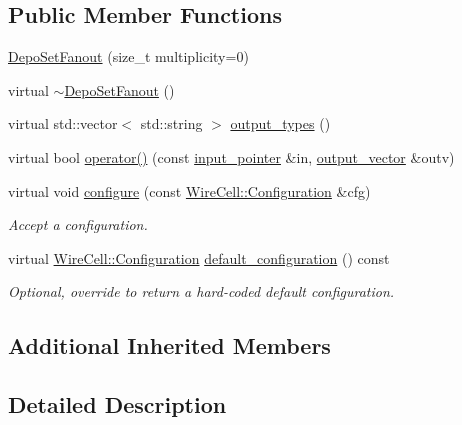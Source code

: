 \subsection*{Public Member Functions}
\begin{DoxyCompactItemize}
\item 
\hyperlink{class_wire_cell_1_1_gen_1_1_depo_set_fanout_a655d25f1ea022ac0edc28852dc01befc}{Depo\+Set\+Fanout} (size\+\_\+t multiplicity=0)
\item 
virtual \hyperlink{class_wire_cell_1_1_gen_1_1_depo_set_fanout_ace5b227dc8d232fbb32e35f7c41788e7}{$\sim$\+Depo\+Set\+Fanout} ()
\item 
virtual std\+::vector$<$ std\+::string $>$ \hyperlink{class_wire_cell_1_1_gen_1_1_depo_set_fanout_a11637470dcf8dc0ea0cbf6691a6984c0}{output\+\_\+types} ()
\item 
virtual bool \hyperlink{class_wire_cell_1_1_gen_1_1_depo_set_fanout_ac00025705044f9d201dadd5d0af70fe9}{operator()} (const \hyperlink{class_wire_cell_1_1_i_fanout_node_aefd36d56a531edf1990fe6e263d9c266}{input\+\_\+pointer} \&in, \hyperlink{class_wire_cell_1_1_i_fanout_node_a650cda83709781daac2d67af7c3706df}{output\+\_\+vector} \&outv)
\item 
virtual void \hyperlink{class_wire_cell_1_1_gen_1_1_depo_set_fanout_abe1609b06fc8b2b16b5f59dd8a724b85}{configure} (const \hyperlink{namespace_wire_cell_a9f705541fc1d46c608b3d32c182333ee}{Wire\+Cell\+::\+Configuration} \&cfg)
\begin{DoxyCompactList}\small\item\em Accept a configuration. \end{DoxyCompactList}\item 
virtual \hyperlink{namespace_wire_cell_a9f705541fc1d46c608b3d32c182333ee}{Wire\+Cell\+::\+Configuration} \hyperlink{class_wire_cell_1_1_gen_1_1_depo_set_fanout_aedeec385e6327446f23c20c546535b5e}{default\+\_\+configuration} () const
\begin{DoxyCompactList}\small\item\em Optional, override to return a hard-\/coded default configuration. \end{DoxyCompactList}\end{DoxyCompactItemize}
\subsection*{Additional Inherited Members}


\subsection{Detailed Description}


